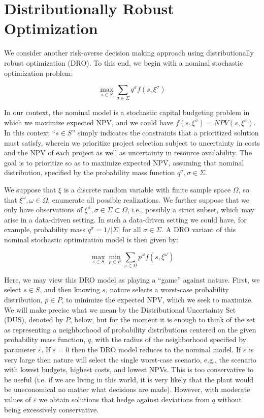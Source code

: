 \section{Distributionally Robust Optimization}
\label{sec:DROCapitalBudgeting}

We consider another risk-averse decision making approach
using distributionally robust optimization (DRO). To this end, we begin with
a nominal stochastic optimization problem:

\begin{equation}
\max_{s\in S} \sum_{\sigma\in \Sigma} q^\sigma f(s,\xi^\sigma)
\end{equation}

In our context, the nominal model is a stochastic capital budgeting problem
in which we maximize expected NPV, and we could have
$f(s,\xi^\sigma)=NPV(s,\xi^\sigma)$. In this context ``$s\in S$'' simply
indicates the constraints that a prioritized solution must satisfy, wherein
we prioritize project selection subject to uncertainty in costs and the NPV
of each project as well as uncertainty in resource availability. The goal is
to prioritize so as to maximize expected NPV, assuming that nominal distribution,
specified by the probability mass function $q^\sigma, \sigma \in \Sigma$.

We suppose that $\xi$ is a discrete random variable with finite sample space $\Omega$,
so that $\xi^\omega, \omega \in \Omega$, enumerate all possible realizations.
We further suppose that we only have observations of
$\xi^\sigma, \sigma \in \Sigma \subset \Omega$,
i.e., possibly a strict subset, which may arise in a data-driven setting. In such a
data-driven setting we could have, for example, probability mass $q^\sigma = 1/|\Sigma|$
for all $\sigma \in \Sigma$.
A DRO variant of this nominal stochastic optimization model is then given by:

\begin{equation}
\max_{s\in S} \min_{p\in P} \sum_{\omega\in \Omega} p^\omega f(s,\xi^\omega)
\end{equation}

Here, we may view this DRO model as playing a ``game'' against nature. First, we select
$s\in S$, and then knowing $s$, nature selects a worst-case probability distribution,
$p\in P$, to minimize the expected NPV, which we seek to maximize. We will make precise
what we mean by the Distributional Uncertainty Set (DUS), denoted by $P$, below, but
for the moment it is enough to think of the set as representing a neighborhood of
probability distributions centered on the given probability mass function, $q$,
with the radius of the neighborhood specified by parameter $\varepsilon$. If
$\varepsilon = 0$ then the DRO model reduces to the nominal model. If $\varepsilon$ is very
large then nature will select the single worst-case scenario, e.g., the scenario
with lowest budgets, highest costs, and lowest NPVs. This is too conservative to be useful
(i.e. if we are living in this world, it is very likely that the plant would be
uneconomical no matter what decisions are made). However, with moderate values of
$\varepsilon$ we obtain solutions that hedge against deviations from $q$ without being
excessively conservative.

